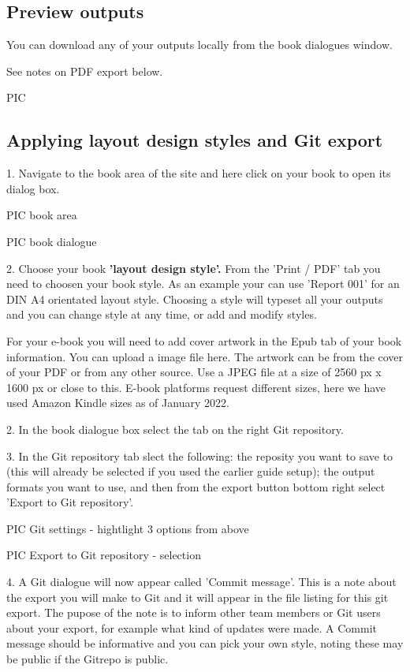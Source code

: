 \documentclass{article}
\begin{document}
\subsection{Preview outputs}\label{H5954601}



You can download any of your outputs locally from the book dialogues window.


See notes on PDF export below.


PIC 


\subsection{Applying layout design styles and Git export}\label{H2238943}



1. Navigate to the book area of the site and here click on your book to open its dialog box.


PIC book area


PIC book dialogue


2. Choose your book \textbf{'layout design style'. }From the 'Print / PDF' tab you need to choosen your book style. As an example your can use 'Report 001' for an DIN A4 orientated layout style. Choosing a style will typeset all your outputs and you can change style at any time, or add and modify styles.


For your e-book you will need to add cover artwork in the Epub tab of your book information. You can upload a image file here. The artwork can be from the cover of your PDF or from any other source. Use a JPEG file at a size of 2560 px x 1600 px or close to this. E-book platforms request different sizes, here we have used Amazon Kindle sizes as of January 2022.


2. In the book dialogue box select the tab on the right Git repository.


3. In the Git repository tab slect the following: the reposity you want to save to (this will already be selected if you used the earlier guide setup); the output formats you want to use, and then from the export button bottom right select 'Export to Git repository'.


PIC Git settings - hightlight 3 options from above


PIC Export to Git repository - selection


4. A Git dialogue will now appear called 'Commit message'. This is a note about the export you will make to Git and it will appear in the file listing for this git export. The pupose of the note is to inform other team members or Git users about your export, for example what kind of updates were made. A Commit message should be informative and you can pick your own style, noting these may be public if the Gitrepo is public.   
\end{document}
